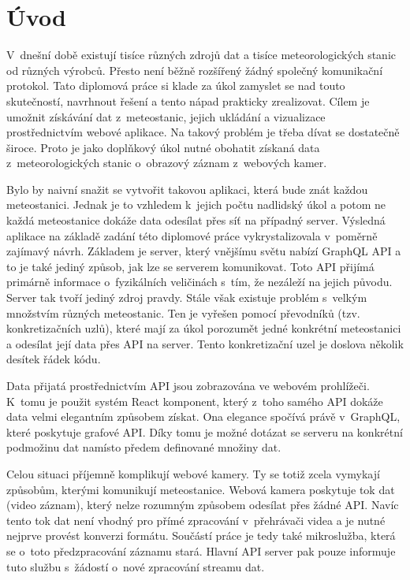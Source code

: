 \chapter{Úvod}

V~dnešní době existují tisíce různých zdrojů dat a tisíce meteorologických stanic od různých výrobců. Přesto není běžně rozšířený žádný společný komunikační protokol. Tato diplomová práce si klade za úkol zamyslet se nad touto skutečností, navrhnout řešení a tento nápad prakticky zrealizovat. Cílem je umožnit získávání dat z~meteostanic, jejich ukládání a vizualizace prostřednictvím webové aplikace. Na takový problém je třeba dívat se dostatečně široce. Proto je jako doplňkový úkol nutné obohatit získaná data z~meteorologických stanic o~obrazový záznam z~webových kamer.

Bylo by naivní snažit se vytvořit takovou aplikaci, která bude znát každou meteostanici. Jednak je to vzhledem k~jejich počtu nadlidský úkol a potom ne každá meteostanice dokáže data odesílat přes síť na případný server. Výsledná aplikace na základě zadání této diplomové práce vykrystalizovala v~poměrně zajímavý návrh. Základem je server, který vnějšímu světu nabízí GraphQL API a to je také jediný způsob, jak lze se serverem komunikovat. Toto API přijímá primárně informace o~fyzikálních veličinách s~tím, že nezáleží na jejich původu. Server tak tvoří jediný zdroj pravdy. Stále však existuje problém s~velkým množstvím různých meteostanic. Ten je vyřešen pomocí převodníků (tzv. konkretizačních uzlů), které mají za úkol porozumět jedné konkrétní meteostanici a odesílat její data přes API na server. Tento konkretizační uzel je doslova několik desítek řádek kódu.

Data přijatá prostřednictvím API jsou zobrazována ve webovém pro\-hlí\-že\-či. K~tomu je použit systém React komponent, který z~toho samého API dokáže data velmi elegantním způsobem získat. Ona elegance spočívá právě v~GraphQL, které poskytuje grafové API. Díky tomu je možné dotázat se serveru na konkrétní podmožinu dat namísto předem definované množiny dat.

Celou situaci příjemně komplikují webové kamery. Ty se totiž zcela vymykají způsobům, kterými komunikují meteostanice. Webová kamera poskytuje tok dat (video záznam), který nelze rozumným způsobem odesílat přes žádné API. Navíc tento tok dat není vhodný pro přímé zpracování v~přehrávači videa a je nutné nejprve provést konverzi formátu. Součástí práce je tedy také mikroslužba, která se o~toto předzpracování záznamu stará. Hlavní API server pak pouze informuje tuto službu s~žádostí o~nové zpracování streamu dat.

